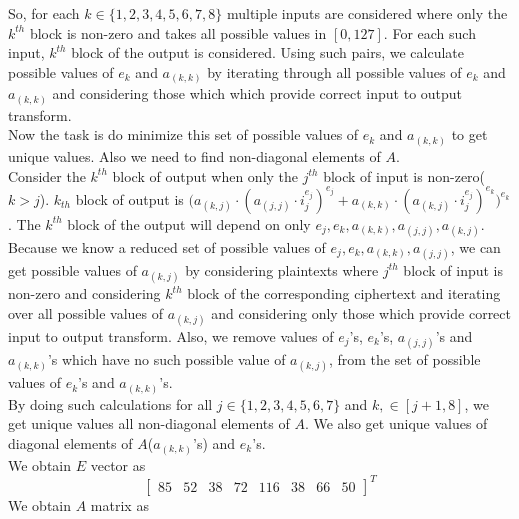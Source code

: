 \documentclass[10pt,twoside]{article}
\begin{document}
So, for each $k \in \{1,2,3,4,5,6,7,8\}$ multiple inputs are considered where only the $k^{th}$ block is non-zero and takes all possible values in $[0, 127]$. For each such input, $k^{th}$ block of the output is considered.  Using such pairs, we calculate possible values of $e_k$ and $a_{(k,k)}$ by iterating through all possible values of $e_k$ and $a_{(k,k)}$ and considering those which which provide correct input to output transform.\\
    


Now the task is do minimize this set of possible values of $e_k$ and  $a_{(k,k)}$ to get unique values. Also we need to find non-diagonal elements of $A$.\\


Consider the $k^{th}$ block of output when only the $j^{th}$ block of input is non-zero($k > j$). $k_{th}$ block of output is $\big(a_{(k,j)}\cdot(a_{(j,j)} \cdot i_j^{e_j})^{e_j} + a_{(k,k)}\cdot(a_{(k,j)} \cdot i_j^{e_j} )^{e_k} \big)^{e_k}$. The $k^{th}$ block of the output will depend on only $e_j, e_k, a_{(k,k)}, a_{(j, j)}, a_{(k, j)}$.\\


Because we know a reduced set of possible values of $e_j, e_k, a_{(k,k)}, a_{(j, j)}$, we can get possible values of $a_{(k, j)}$ by considering plaintexts where $j^{th}$ block of input is non-zero and considering $k^{th}$ block of the corresponding ciphertext and iterating over all possible values of $a_{(k, j)}$ and considering only those which provide correct input to output transform.
Also, we remove values of $e_j$'s, $e_k$'s, $a_{(j,j)}$'s  and $a_{(k,k)}$'s which have no such possible value of $a_{(k, j)}$, from the set of possible values of $e_k$'s and $a_{(k,k)}$'s.\\
By doing such calculations for all $j \in \{1,2,3,4,5,6,7\}$ and $k,  \in [j+1, 8]$, we get unique values all non-diagonal elements of $A$. We also get unique values of diagonal elements of $A$($a_{(k,k)}$'s) and $e_k$'s.\\
We obtain $E$ vector as 
$$\begin{bmatrix}
85 & 52 & 38 & 72& 116& 38& 66& 50
  \end{bmatrix}^T$$
 We obtain $A$ matrix as
 
\end{document}
